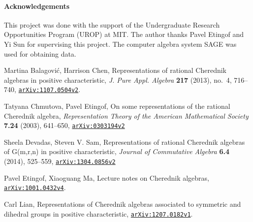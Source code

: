 \documentclass{article}
\numberwithin{equation}{section}
\newcommand{\arxiv}[1]{\href{http://arxiv.org/abs/#1}{{\tt arXiv:#1}}}
\begin{document}
\paragraph{Acknowledgements} This project was done with the support of the Undergraduate Research Opportunities Program (UROP) at MIT. The author thanks Pavel Etingof and Yi Sun for supervising this project. The computer algebra system SAGE was used for obtaining data.




\begin{thebibliography}{2}

\setlength{\itemsep}{-1mm}
\small

 Martina Balagovi\'c, Harrison Chen, Representations of rational Cherednik algebras in positive characteristic, {\it J. Pure Appl. Algebra} {\bf 217} (2013), no.~4, 716--740, \arxiv{1107.0504v2}.

 Tatyana Chmutova, Pavel Etingof, On some representations of the rational Cherednik algebra, {\it Representation Theory of the American Mathematical Society} {\bf 7.24} (2003), 641--650, \arxiv{0303194v2}

 Sheela Devadas, Steven V. Sam, Representations of rational Cherednik algebras of G(m,r,n) in positive characteristic, {\it Journal of Commutative Algebra} {\bf 6.4} (2014), 525--559, \arxiv{1304.0856v2}

 Pavel Etingof, Xiaoguang Ma, Lecture notes on Cherednik algebras, \arxiv{1001.0432v4}.

 Carl Lian, Representations of Cherednik algebras associated to symmetric and dihedral groups in positive characteristic, \arxiv{1207.0182v1}.

\end{thebibliography}
\end{document}
